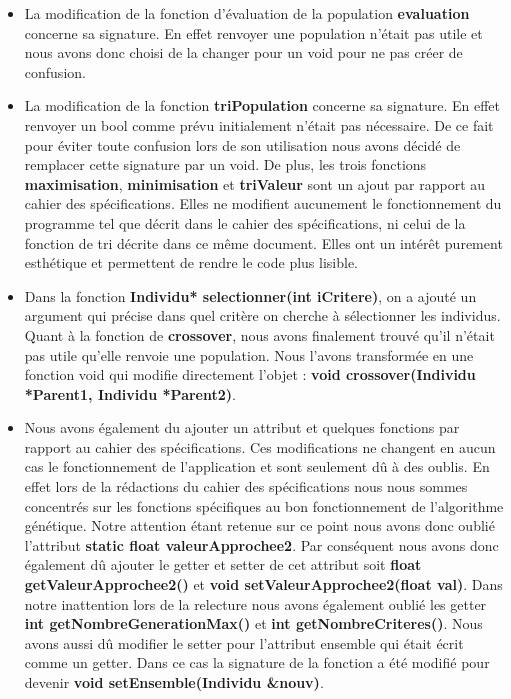 \documentclass[a4paper,11pt]{article}
\begin{document}
\begin{itemize}
   					\item La modification de la fonction d’évaluation de la population \textbf{evaluation} concerne sa signature. En effet renvoyer une population n’était pas utile et nous avons donc choisi de la changer pour un void pour ne pas créer de confusion.

   					\item La modification de la fonction  \textbf{triPopulation} concerne sa signature. En effet renvoyer un bool comme prévu initialement n’était pas nécessaire. De ce fait pour éviter toute confusion lors de son utilisation nous avons décidé de remplacer cette signature par un void.
					De plus, les trois fonctions  \textbf{maximisation},  \textbf{minimisation} et  \textbf{triValeur} sont un ajout par rapport au cahier des spécifications. Elles ne modifient aucunement le fonctionnement du programme tel que décrit dans le cahier des spécifications, ni celui de la fonction de tri décrite dans ce même document. Elles ont un intérêt purement esthétique et permettent de rendre le code plus lisible.

					\item Dans la fonction  \textbf{Individu* selectionner(int iCritere)}, on a ajouté un argument qui précise dans quel critère on cherche à sélectionner les individus.
					Quant à la fonction de  \textbf{crossover}, nous avons finalement trouvé qu’il n’était pas utile qu’elle renvoie une population. Nous l’avons transformée en une fonction void qui modifie directement l’objet :  \textbf{void crossover(Individu *Parent1, Individu *Parent2)}.

					\item Nous avons également du ajouter un attribut et quelques fonctions par rapport au cahier des spécifications. Ces modifications ne changent en aucun cas le fonctionnement de l’application et sont seulement dû à des oublis. En effet lors de la rédactions du cahier des spécifications nous nous sommes concentrés sur les fonctions spécifiques au bon fonctionnement de l’algorithme génétique. Notre attention étant retenue sur ce point nous avons donc oublié l’attribut  \textbf{static float valeurApprochee2}. Par conséquent nous avons donc également dû ajouter le getter et setter de cet attribut soit  \textbf{float getValeurApprochee2()} et  \textbf{void setValeurApprochee2(float val)}. Dans notre inattention lors de la relecture nous avons également oublié les getter  \textbf{int getNombreGenerationMax()} et  \textbf{int getNombreCriteres()}. Nous avons aussi dû modifier le setter pour l’attribut ensemble qui était écrit comme un getter. Dans ce cas la signature de la fonction a été modifié pour devenir  \textbf{void setEnsemble(Individu \&nouv)}.\\
				\end{itemize}
\end{document}
